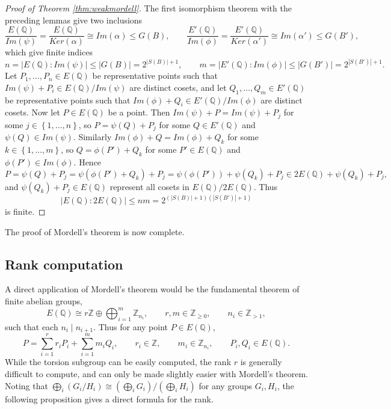 \documentclass{article}
\newcommand{\Z}{\mathbb{Z}}
\newcommand{\Q}{\mathbb{Q}}
\newcommand{\rb}[1]{\left( #1 \right)}
\newcommand{\cb}[1]{\left\{ #1 \right\}}
\newcommand{\abs}[1]{\left\lvert #1 \right\rvert}
\theoremstyle{definition}\newtheorem*{definition}{Definition}
\theoremstyle{definition}\newtheorem*{example}{Example}
\theoremstyle{definition}\newtheorem*{remark}{Remark}
\begin{document}
\begin{proof}[Proof of Theorem \ref{thm:weakmordell}]
The first isomorphism theorem with the preceding lemmas give two inclusions
$$ \dfrac{E\rb{\Q}}{Im\rb{\psi}} = \dfrac{E\rb{\Q}}{Ker\rb{\alpha}} \cong Im\rb{\alpha} \le G\rb{B}, \qquad \dfrac{E'\rb{\Q}}{Im\rb{\phi}} = \dfrac{E'\rb{\Q}}{Ker\rb{\alpha'}} \cong Im\rb{\alpha'} \le G\rb{B'}, $$
which give finite indices
$$ n = \abs{E\rb{\Q} : Im\rb{\psi}} \le \abs{G\rb{B}} = 2^{\abs{S\rb{B}} + 1}, \qquad m = \abs{E'\rb{\Q} : Im\rb{\phi}} \le \abs{G\rb{B'}} = 2^{\abs{S\rb{B'}} + 1}. $$
Let $ P_1, \dots, P_n \in E\rb{\Q} $ be representative points such that $ Im\rb{\psi} + P_i \in E\rb{\Q} / Im\rb{\psi} $ are distinct cosets, and let $ Q_1, \dots, Q_m \in E'\rb{\Q} $ be representative points such that $ Im\rb{\phi} + Q_i \in E'\rb{\Q} / Im\rb{\phi} $ are distinct cosets. Now let $ P \in E\rb{\Q} $ be a point. Then $ Im\rb{\psi} + P = Im\rb{\psi} + P_j $ for some $ j \in \cb{1, \dots, n} $, so $ P = \psi\rb{Q} + P_j $ for some $ Q \in E'\rb{\Q} $ and $ \psi\rb{Q} \in Im\rb{\psi} $. Similarly $ Im\rb{\phi} + Q = Im\rb{\phi} + Q_k $ for some $ k \in \cb{1, \dots, m} $, so $ Q = \phi\rb{P'} + Q_k $ for some $ P' \in E\rb{\Q} $ and $ \phi\rb{P'} \in Im\rb{\phi} $. Hence
$$ P = \psi\rb{Q} + P_j = \psi\rb{\phi\rb{P'} + Q_k} + P_j = \psi\rb{\phi\rb{P'}} + \psi\rb{Q_k} + P_j \in 2E\rb{\Q} + \psi\rb{Q_k} + P_j, $$
and $ \psi\rb{Q_k} + P_j \in E\rb{\Q} $ represent all cosets in $ E\rb{\Q} / 2E\rb{\Q} $. Thus
$$ \abs{E\rb{\Q} : 2E\rb{\Q}} \le nm = 2^{\rb{\abs{S\rb{B}} + 1}\rb{\abs{S\rb{B'}} + 1}} $$
is finite.
\end{proof}

The proof of Mordell's theorem is now complete.

\pagebreak

\subsection{Rank computation}

A direct application of Mordell's theorem would be the fundamental theorem of finite abelian groups,
$$ E\rb{\Q} \cong r\Z \oplus \bigoplus_{i = 1}^m \Z_{n_i}, \qquad r, m \in \Z_{\ge 0}, \qquad n_i \in \Z_{> 1}, $$
such that each $ n_i \mid n_{i + 1} $. Thus for any point $ P \in E\rb{\Q} $,
$$ P = \sum_{i = 1}^r r_iP_i + \sum_{i = 1}^m m_iQ_i, \qquad r_i \in \Z, \qquad m_i \in \Z_{n_i}, \qquad P_i, Q_i \in E\rb{\Q}. $$
While the torsion subgroup can be easily computed, the rank $ r $ is generally difficult to compute, and can only be made slightly easier with Mordell's theorem. Noting that $ \bigoplus_i \rb{G_i / H_i} \cong \rb{\bigoplus_i G_i} / \rb{\bigoplus_i H_i} $ for any groups $ G_i, H_i $, the following proposition gives a direct formula for the rank.
\end{document}
